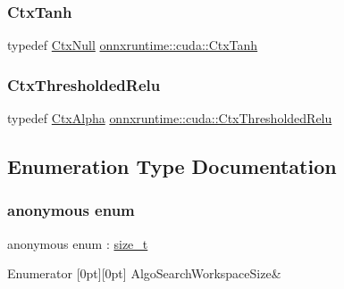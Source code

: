 \subsubsection{\texorpdfstring{Ctx\+Tanh}{CtxTanh}}
{\footnotesize\ttfamily typedef \mbox{\hyperlink{structonnxruntime_1_1cuda_1_1CtxNull}{Ctx\+Null}} \mbox{\hyperlink{namespaceonnxruntime_1_1cuda_a04d57cf277e10eb120f22d7792eec766}{onnxruntime\+::cuda\+::\+Ctx\+Tanh}}}

\mbox{\label{namespaceonnxruntime_1_1cuda_a5a031261a1b4d011e11b6d8771952bd0}} 
\subsubsection{\texorpdfstring{Ctx\+Thresholded\+Relu}{CtxThresholdedRelu}}
{\footnotesize\ttfamily typedef \mbox{\hyperlink{structonnxruntime_1_1cuda_1_1CtxAlpha}{Ctx\+Alpha}} \mbox{\hyperlink{namespaceonnxruntime_1_1cuda_a5a031261a1b4d011e11b6d8771952bd0}{onnxruntime\+::cuda\+::\+Ctx\+Thresholded\+Relu}}}



\subsection{Enumeration Type Documentation}
\mbox{\label{namespaceonnxruntime_1_1cuda_af141cf21c6b64c85617abb96202bb948}} 
\subsubsection{\texorpdfstring{anonymous enum}{anonymous enum}}
{\footnotesize\ttfamily anonymous enum \+: \mbox{\hyperlink{mlasi_8h_a503efbc1c6e50825320ad909366b78ab}{size\+\_\+t}}}

\begin{DoxyEnumFields}{Enumerator}
[0pt][0pt]{}\mbox{\label{namespaceonnxruntime_1_1cuda_af141cf21c6b64c85617abb96202bb948a5b57b98b7bc56657f65dea953fae7666}} 
Algo\+Search\+Workspace\+Size&\\
\hline

\end{DoxyEnumFields}
\mbox{\label{namespaceonnxruntime_1_1cuda_aa9f83573eddf1eee5577bb1c6aaae920}} 

